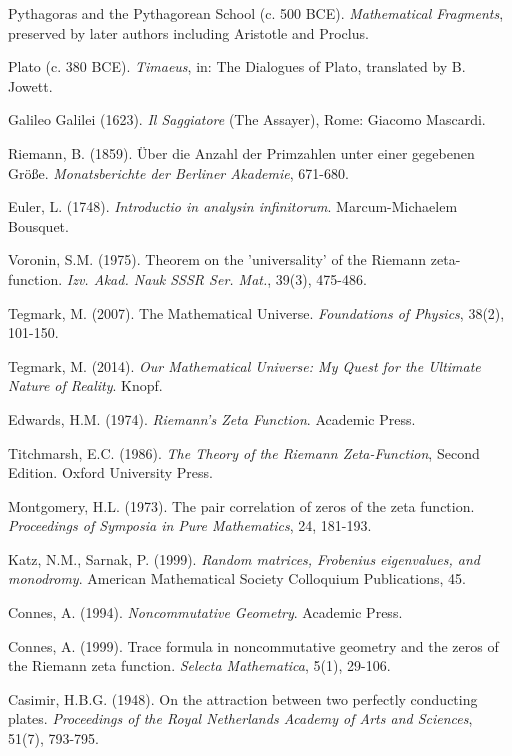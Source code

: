\documentclass[12pt]{article}
\theoremstyle{plain}
\theoremstyle{definition}
\begin{document}
\begin{thebibliography}{99}

 Pythagoras and the Pythagorean School (c. 500 BCE). \emph{Mathematical Fragments}, preserved by later authors including Aristotle and Proclus.

 Plato (c. 380 BCE). \emph{Timaeus}, in: The Dialogues of Plato, translated by B. Jowett.

 Galileo Galilei (1623). \emph{Il Saggiatore} (The Assayer), Rome: Giacomo Mascardi.

 Riemann, B. (1859). Über die Anzahl der Primzahlen unter einer gegebenen Größe. \emph{Monatsberichte der Berliner Akademie}, 671-680.

 Euler, L. (1748). \emph{Introductio in analysin infinitorum}. Marcum-Michaelem Bousquet.

 Voronin, S.M. (1975). Theorem on the 'universality' of the Riemann zeta-function. \emph{Izv. Akad. Nauk SSSR Ser. Mat.}, 39(3), 475-486.

 Tegmark, M. (2007). The Mathematical Universe. \emph{Foundations of Physics}, 38(2), 101-150.

 Tegmark, M. (2014). \emph{Our Mathematical Universe: My Quest for the Ultimate Nature of Reality}. Knopf.

 Edwards, H.M. (1974). \emph{Riemann's Zeta Function}. Academic Press.

 Titchmarsh, E.C. (1986). \emph{The Theory of the Riemann Zeta-Function}, Second Edition. Oxford University Press.

 Montgomery, H.L. (1973). The pair correlation of zeros of the zeta function. \emph{Proceedings of Symposia in Pure Mathematics}, 24, 181-193.

 Katz, N.M., Sarnak, P. (1999). \emph{Random matrices, Frobenius eigenvalues, and monodromy}. American Mathematical Society Colloquium Publications, 45.

 Connes, A. (1994). \emph{Noncommutative Geometry}. Academic Press.

 Connes, A. (1999). Trace formula in noncommutative geometry and the zeros of the Riemann zeta function. \emph{Selecta Mathematica}, 5(1), 29-106.

 Casimir, H.B.G. (1948). On the attraction between two perfectly conducting plates. \emph{Proceedings of the Royal Netherlands Academy of Arts and Sciences}, 51(7), 793-795.


\end{thebibliography}
\end{document}
